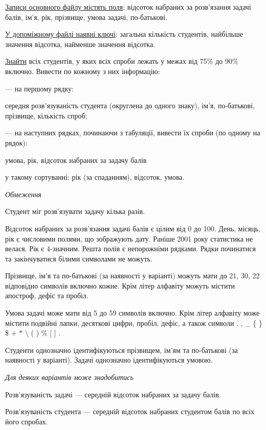 \documentclass[11pt, ukrainian]{article}
\begin{document}
\underline{Записи основного файлу містять поля}: відсоток набраних за розв’язання задачі балів, ім’я, рік, прізвище, умова задачі, по-батькові.

\underline{У допоміжному файлі наявні ключі}: загальна кількість студентів, найбільше значення відсотка, найменше значення відсотка.

\underline{Знайти} всіх студентів, у яких всіх спроби лежать у межах від 75\% до 90\% включно. Вивести по кожному з них інформацію:\par
{\noindent}--- на першому рядку:\par
середня розв’язуваність студента (округлена до одного знаку), ім’я, по-батькові, прізвище, кількість спроб;

{\noindent}--- на наступних рядках, починаючи з табуляції, вивести їх спроби (по одному на рядок):\par
умова, рік, відсоток набраних за задачу балів

{\noindent}у такому сортуванні: рік (за спаданням), відсоток, умова.


\bigskip\textit{Обмеження}

Студент міг розв’язувати задачу кілька разів.

Відсоток набраних за розв’язання задачі балів є цілим від 0 до 100.
День, місяць, рік є числовими полями, що зображують дату.
Раніше 2001 року статистика не велася. Рік є 4-значним.
Решта полів є непорожніми рядками.
Рядки починатися та закінчуватися білими символами не можуть.

Прізвище, ім’я та по-батькові (за наявності у варіанті) можуть мати до 21, 30, 22 відповідно символів включно кожне. 
Крім літер алфавіту можуть містити апостроф, дефіс та пробіл.

Умова задачі може мати від 5 до 59 символів включно.
Крім літер алфавіту може містити подвійні лапки, десяткові цифри, пробіл, дефіс,
а також символи . , \_ \{ \} \$ $+$ $*$ {\textbackslash} ( ) \% $[$ $]$ .

Студенти однозначно ідентифікуються прізвищем, ім’ям та по-батькові (за наявності у варіанті).
Задачі однозначно ідентифікуються умовою.

\bigskip\textit{Для деяких варіантів може знадобитись}

Розв'язуваність задачі --- середній відсоток набраних за задачу балів.

Розв'язуваність студента --- середній відсоток набраних студентом балів по всіх його спробах.
\end{document}
